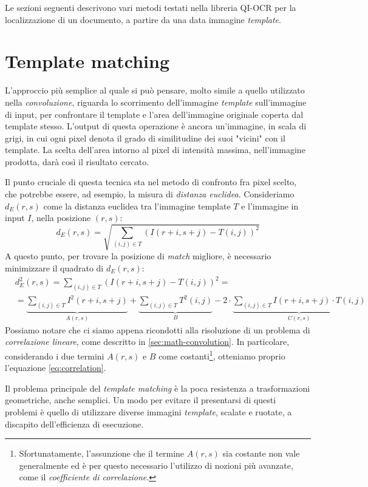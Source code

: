 Le sezioni seguenti descrivono vari metodi testati nella libreria QI-OCR per la localizzazione di un documento, a partire da una data immagine \textit{template}.


\section{Template matching}
\label{sec:template-matching}
L'approccio pi\`u semplice al quale si pu\`o pensare, molto simile a quello utilizzato nella \textit{convoluzione}, riguarda lo scorrimento dell'immagine \textit{template} sull'immagine di input, per confrontare il template e l'area dell'immagine originale coperta dal template stesso. L'output di questa operazione \`e ancora un'immagine, in scala di grigi, in cui ogni pixel denota il grado di similitudine dei suoi "vicini" con il template. La scelta dell'area intorno al pixel di intensit\`a massima, nell'immagine prodotta, dar\`a cos\`i il risultato cercato.\par
Il punto cruciale di questa tecnica sta nel metodo di confronto fra pixel scelto, che potrebbe essere, ad esempio, la misura di \textit{distanza euclidea}. Consideriamo $d_{E}(r, s)$ come la distanza euclidea tra l'immagine template $T$ e l'immagine in input $I$, nella posizione $(r, s)$:
\begin{equation}
	\label{eq:euclidean-distance}
	d_{E}(r, s) = \sqrt{\sum_{(i, j)\in T} (I(r + i, s + j) - T(i, j))^{2}}
\end{equation}
A questo punto, per trovare la posizione di \textit{match} migliore, \`e necessario minimizzare il quadrato di $d_{E}(r, s)$:
\begin{equation}
	\label{eq:euclidean-distance-squared}
	\begin{split}
		& d_{E}^{2}(r, s) = \sum_{(i, j)\in T} (I(r + i, s + j) - T(i, j))^{2} = \\
		& = \underbrace{\sum_{(i, j)\in T} I^{2}(r + i, s + j)}_{A(r,s)} + \underbrace{\sum_{(i, j)\in T} T^{2}(i, j)}_{B} - 2 \cdot \underbrace{\sum_{(i, j)\in T} I(r + i, s + j) \cdot T(i, j)}_{C(r,s)}  
	\end{split}
\end{equation}
Possiamo notare che ci siamo appena ricondotti alla risoluzione di un problema di \textit{correlazione lineare}, come descritto in \ref{sec:math-convolution}. In particolare, considerando i due termini $A(r,s)$ e $B$ come costanti\footnote{Sfortunatamente, l'assunzione che il termine $A(r,s)$ sia costante non vale generalmente ed \`e per questo necessario l'utilizzo di nozioni pi\`u avanzate, come il \textit{coefficiente di correlazione}.}, otteniamo proprio l'equazione \ref{eq:correlation}.\par
Il problema principale del \textit{template matching} \`e la poca resistenza a trasformazioni geometriche, anche semplici. Un modo per evitare il presentarsi di questi problemi \`e quello di utilizzare diverse immagini \textit{template}, scalate e ruotate, a discapito dell'efficienza di esecuzione.


